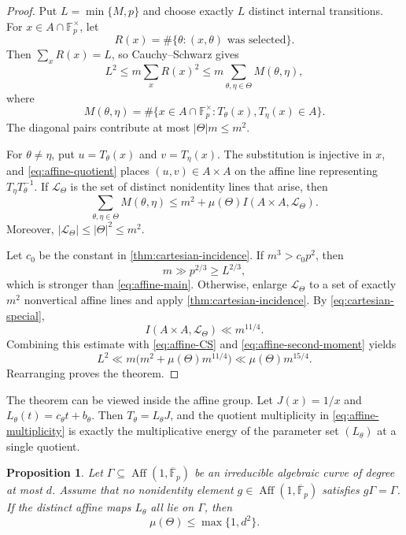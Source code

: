 \documentclass[11pt,reqno]{amsart}
\numberwithin{equation}{section}
\newtheorem{proposition}[proposition]{Proposition}
\theoremstyle{definition}
\theoremstyle{remark}
\newcommand{\F}{\mathbb F}
\newcommand{\Aff}{\operatorname{Aff}}
\newcommand{\cL}{\mathcal L}
\begin{document}
\begin{proof}
Put $L=\min\{M,p\}$ and choose exactly $L$ distinct internal transitions.  For $x\in A\cap\F_p^\times$, let
\[
  R(x)=\#\{\theta:(x,\theta)\text{ was selected}\}.
\]
Then $\sum_xR(x)=L$, so Cauchy--Schwarz gives
\begin{equation}\label{eq:affine-CS}
  L^2
  \le m\sum_xR(x)^2
  \le m\sum_{\theta,\eta\in\Theta}M(\theta,\eta),
\end{equation}
where
\[
  M(\theta,\eta)
  =\#\{x\in A\cap\F_p^\times:
       T_\theta(x),T_\eta(x)\in A\}.
\]
The diagonal pairs contribute at most $|\Theta|m\le m^2$.

For $\theta\ne\eta$, put $u=T_\theta(x)$ and $v=T_\eta(x)$.  The substitution is injective in $x$, and \eqref{eq:affine-quotient} places $(u,v)\in A\times A$ on the affine line representing $T_\eta T_\theta^{-1}$.  If $\cL_\Theta$ is the set of distinct nonidentity lines that arise, then
\begin{equation}\label{eq:affine-second-moment}
  \sum_{\theta,\eta\in\Theta}M(\theta,\eta)
  \le m^2+\mu(\Theta)I(A\times A,\cL_\Theta).
\end{equation}
Moreover, $|\cL_\Theta|\le|\Theta|^2\le m^2$.

Let $c_0$ be the constant in \cref{thm:cartesian-incidence}.  If $m^3>c_0p^2$, then
\[
  m\gg p^{2/3}\ge L^{2/3},
\]
which is stronger than \eqref{eq:affine-main}.  Otherwise, enlarge $\cL_\Theta$ to a set of exactly $m^2$ nonvertical affine lines and apply \cref{thm:cartesian-incidence}.  By \eqref{eq:cartesian-special},
\[
  I(A\times A,\cL_\Theta)\ll m^{11/4}.
\]
Combining this estimate with \eqref{eq:affine-CS} and \eqref{eq:affine-second-moment} yields
\[
  L^2\ll m\bigl(m^2+\mu(\Theta)m^{11/4}\bigr)
  \ll \mu(\Theta)m^{15/4}.
\]
Rearranging proves the theorem.
\end{proof}

The theorem can be viewed inside the affine group.  Let $J(x)=1/x$ and $L_\theta(t)=c_\theta t+b_\theta$.  Then $T_\theta=L_\theta J$, and the quotient multiplicity in \eqref{eq:affine-multiplicity} is exactly the multiplicative energy of the parameter set $(L_\theta)$ at a single quotient.

\begin{proposition}\label{prop:affine-curve}
Let $\Gamma\subseteq\Aff(1,\overline{\F}_p)$ be an irreducible algebraic curve of degree at most $d$.  Assume that no nonidentity element $g\in\Aff(1,\overline{\F}_p)$ satisfies $g\Gamma=\Gamma$.  If the distinct affine maps $L_\theta$ all lie on $\Gamma$, then
\begin{equation}\label{eq:affine-curve-multiplicity}
  \mu(\Theta)\le\max\{1,d^2\}.
\end{equation}
\end{proposition}
\end{document}
